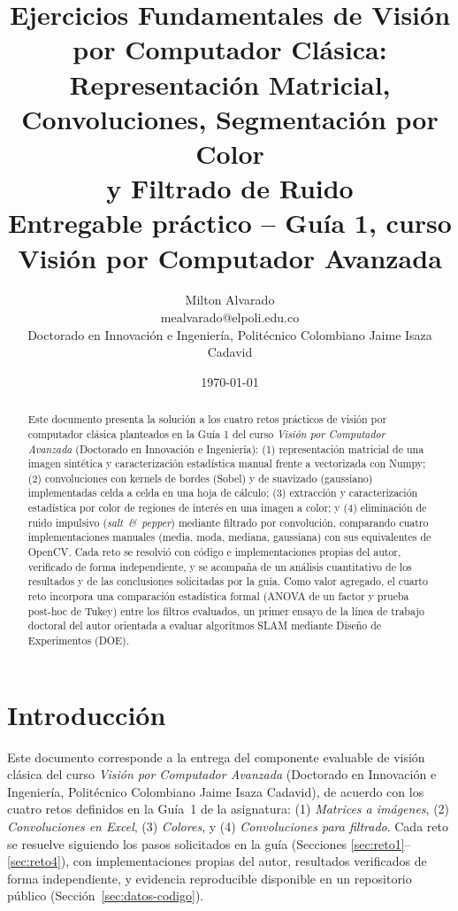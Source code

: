 \documentclass[11pt]{article}
\title{Ejercicios Fundamentales de Visión por Computador Clásica:\\
Representación Matricial, Convoluciones, Segmentación por Color\\
y Filtrado de Ruido\\
\large Entregable práctico -- Guía 1, curso Visión por Computador Avanzada}
\author{Milton Alvarado \\ \small mealvarado@elpoli.edu.co \\
\small Doctorado en Innovación e Ingeniería, Politécnico Colombiano Jaime Isaza Cadavid}
\date{\today}
\begin{document}
\maketitle

\begin{abstract}
Este documento presenta la solución a los cuatro retos prácticos de visión
por computador clásica planteados en la Guía 1 del curso \emph{Visión por
Computador Avanzada} (Doctorado en Innovación e Ingeniería): (1)
representación matricial de una imagen sintética y caracterización
estadística manual frente a vectorizada con Numpy; (2) convoluciones con
kernels de bordes (Sobel) y de suavizado (gaussiano) implementadas celda a
celda en una hoja de cálculo; (3) extracción y caracterización estadística
por color de regiones de interés en una imagen a color; y (4) eliminación
de ruido impulsivo (\emph{salt~\&~pepper}) mediante filtrado por
convolución, comparando cuatro implementaciones manuales (media, moda,
mediana, gaussiana) con sus equivalentes de OpenCV. Cada reto se resolvió
con código e implementaciones propias del autor, verificado de forma
independiente, y se acompaña de un análisis cuantitativo de los resultados
y de las conclusiones solicitadas por la guía. Como valor agregado, el
cuarto reto incorpora una comparación estadística formal (ANOVA de un
factor y prueba post-hoc de Tukey) entre los filtros evaluados, un primer
ensayo de la línea de trabajo doctoral del autor orientada a evaluar
algoritmos SLAM mediante Diseño de Experimentos (DOE).
\end{abstract}

\section{Introducción}
Este documento corresponde a la entrega del componente evaluable de visión
clásica del curso \emph{Visión por Computador Avanzada} (Doctorado en
Innovación e Ingeniería, Politécnico Colombiano Jaime Isaza Cadavid), de
acuerdo con los cuatro retos definidos en la Guía~1 de la asignatura: (1)
\emph{Matrices a imágenes}, (2) \emph{Convoluciones en Excel}, (3)
\emph{Colores}, y (4) \emph{Convoluciones para filtrado}. Cada reto se
resuelve siguiendo los pasos solicitados en la guía (Secciones
\ref{sec:reto1}--\ref{sec:reto4}), con implementaciones propias del autor,
resultados verificados de forma independiente, y evidencia reproducible
disponible en un repositorio público (Sección~\ref{sec:datos-codigo}).
\end{document}
